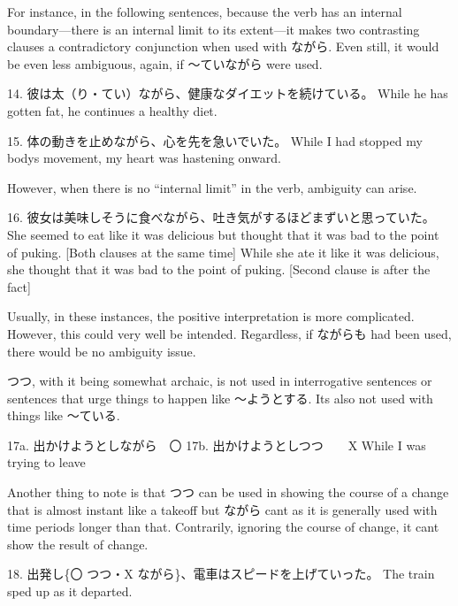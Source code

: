 \par{ For instance, in the following sentences, because the verb has an internal boundary—there is an internal limit to its extent—it makes two contrasting clauses a contradictory conjunction when used with ながら. Even still, it would be even less ambiguous, again, if ～ていながら were used. }

\par{14. 彼は太（り・てい）ながら、健康なダイエットを続けている。 \hfill\break
While he has gotten fat, he continues a healthy diet. }

\par{15. 体の動きを止めながら、心を先を急いでいた。 \hfill\break
While I had stopped my body\textquotesingle s movement, my heart was hastening onward. }

\par{ However, when there is no “internal limit” in the verb, ambiguity can arise. }

\par{16. 彼女は美味しそうに食べながら、吐き気がするほどまずいと思っていた。 \hfill\break
She seemed to eat like it was delicious but thought that it was bad to the point of puking. [Both clauses at the same time] \hfill\break
While she ate it like it was delicious, she thought that it was bad to the point of puking. [Second clause is after the fact] }

\par{ Usually, in these instances, the positive interpretation is more complicated. However, this could very well be intended. Regardless, if ながらも had been used, there would be no ambiguity issue. }

\par{ つつ, with it being somewhat archaic, is not used in interrogative sentences or sentences that urge things to happen like ～ようとする. It\textquotesingle s also not used with things like ～ている. }

\par{17a. 出かけようとしながら　〇 \hfill\break
17b. 出かけようとしつつ　　X \hfill\break
While I was trying to leave  }

\par{ Another thing to note is that つつ can be used in showing the course of a change that is almost instant like a takeoff but ながら can\textquotesingle t as it is generally used with time periods longer than that. Contrarily, ignoring the course of change, it can\textquotesingle t show the result of change. }

\par{18. 出発し\{〇 つつ・X ながら\}、電車はスピードを上げていった。 \hfill\break
The train sped up as it departed. }

